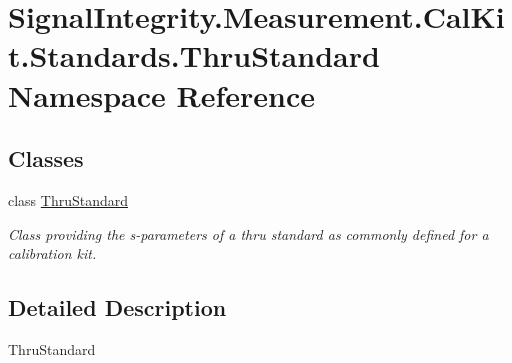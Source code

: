 \hypertarget{namespaceSignalIntegrity_1_1Measurement_1_1CalKit_1_1Standards_1_1ThruStandard}{}\section{Signal\+Integrity.\+Measurement.\+Cal\+Kit.\+Standards.\+Thru\+Standard Namespace Reference}
\label{namespaceSignalIntegrity_1_1Measurement_1_1CalKit_1_1Standards_1_1ThruStandard}
\subsection*{Classes}
\begin{DoxyCompactItemize}
\item 
class \hyperlink{classSignalIntegrity_1_1Measurement_1_1CalKit_1_1Standards_1_1ThruStandard_1_1ThruStandard}{Thru\+Standard}
\begin{DoxyCompactList}\small\item\em Class providing the s-\/parameters of a thru standard as commonly defined for a calibration kit. \end{DoxyCompactList}\end{DoxyCompactItemize}


\subsection{Detailed Description}
\begin{DoxyVerb}ThruStandard\end{DoxyVerb}
 